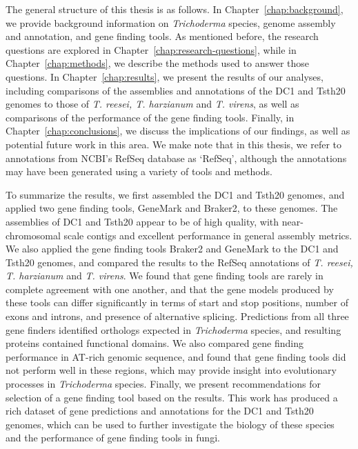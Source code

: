 The general structure of this thesis is as follows. In Chapter~\ref{chap:background}, we provide background information on \textit{Trichoderma} species, genome assembly and annotation, and gene finding tools. As mentioned before, the research questions are explored in Chapter~\ref{chap:research-questions}, while in Chapter~\ref{chap:methods}, we describe the methods used to answer those questions. In Chapter~\ref{chap:results}, we present the results of our analyses, including comparisons of the assemblies and annotations of the DC1 and Tsth20 genomes to those of \textit{T. reesei, T. harzianum} and \textit{T. virens}, as well as comparisons of the performance of the gene finding tools. Finally, in Chapter~\ref{chap:conclusions}, we discuss the implications of our findings, as well as potential future work in this area. We make note that in this thesis, we refer to annotations from NCBI's RefSeq database as `RefSeq', although the annotations may have been generated using a variety of tools and methods. 

  To summarize the results, we first assembled the DC1 and Tsth20 genomes, and applied two gene finding tools, GeneMark and Braker2, to these genomes. The assemblies of DC1 and Tsth20 appear to be of high quality, with near-chromosomal scale contigs and excellent performance in general assembly metrics. We also applied the gene finding tools Braker2 and GeneMark to the DC1 and Tsth20 genomes, and compared the results to the RefSeq annotations of \textit{T. reesei, T. harzianum} and \textit{T. virens}. We found that gene finding tools are rarely in complete agreement with one another, and that the gene models produced by these tools can differ significantly in terms of start and stop positions, number of exons and introns, and presence of alternative splicing. Predictions from all three gene finders identified orthologs expected in \textit{Trichoderma} species, and resulting proteins contained functional domains. We also compared gene finding performance in AT-rich genomic sequence, and found that gene finding tools did not perform well in these regions, which may provide insight into evolutionary processes in \textit{Trichoderma} species. Finally, we present recommendations for selection of a gene finding tool based on the results. This work has produced a rich dataset of gene predictions and annotations for the DC1 and Tsth20 genomes, which can be used to further investigate the biology of these species and the performance of gene finding tools in fungi.